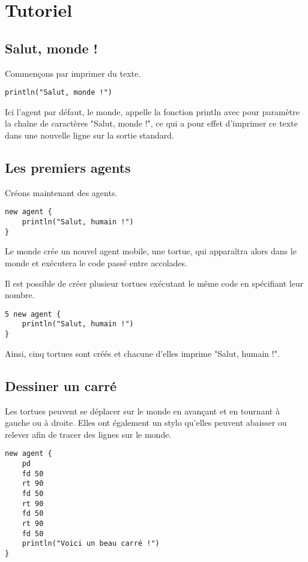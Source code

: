 \section{Tutoriel}

\subsection{Salut, monde !}

Commençons par imprimer du texte.

\begin{verbatim}
println("Salut, monde !")
\end{verbatim}

Ici l'agent par défaut, le monde, appelle la fonction println avec pour paramètre la chaîne de caractères "Salut, monde !", ce qui a pour effet d'imprimer ce texte dans une nouvelle ligne sur la sortie standard.

\subsection{Les premiers agents}

Créons maintenant des agents.

\begin{verbatim}
new agent {
    println("Salut, humain !")
}
\end{verbatim}

Le monde crée un nouvel agent mobile, une tortue, qui apparaîtra alors dans le monde et exécutera le code passé entre accolades.

Il est possible de créer plusieur tortues exécutant le même code en spécifiant leur nombre.

\begin{verbatim}
5 new agent {
    println("Salut, humain !")
}
\end{verbatim}

Ainsi, cinq tortues sont créés et chacune d'elles imprime "Salut, humain !".

\subsection{Dessiner un carré}

Les tortues peuvent se déplacer sur le monde en avançant et en tournant à gauche ou à droite. Elles ont également un stylo qu'elles peuvent abaisser ou relever afin de tracer des lignes sur le monde.

\begin{verbatim}
new agent {
    pd
    fd 50
    rt 90
    fd 50
    rt 90
    fd 50
    rt 90
    fd 50
    println("Voici un beau carré !")
}
\end{verbatim}

